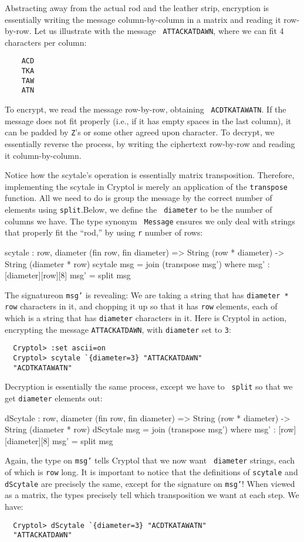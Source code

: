 Abstracting away from the actual rod and the leather strip, encryption
is essentially writing the message column-by-column in a matrix and
reading it row-by-row.  Let us illustrate with the message {\tt
  ATTACKATDAWN}, where we can fit 4 characters per column:
\begin{verbatim}
    ACD
    TKA
    TAW
    ATN
\end{verbatim}
To encrypt, we read the message row-by-row, obtaining {\tt
  ACDTKATAWATN}. If the message does not fit properly (i.e., if it has
empty spaces in the last column), it can be padded by {\tt Z}'s or
some other agreed upon character. To decrypt, we essentially reverse
the process, by writing the ciphertext row-by-row and reading it
column-by-column.

Notice how the scytale's operation is essentially matrix
transposition.  Therefore, implementing the scytale in Cryptol is
merely an application of the {\tt transpose} function.\indTranspose
All we need to do is group the message by the correct number of
elements using {\tt split}.\indSplit Below, we define the {\tt
  diameter} to be the number of columns we have. The type synonym {\tt
  Message} ensures we only deal with strings that properly fit the
``rod,'' by using {\tt r} number of rows:\indJoin

\begin{code}
  scytale : {row, diameter} (fin row, fin diameter)
            => String (row * diameter) -> String (diameter * row)
  scytale msg = join (transpose msg')
       where   msg' : [diameter][row][8]
               msg' = split msg
\end{code}
The signature\indSignature on {\tt msg'} is revealing: We are taking a
string that has {\tt diameter * row} characters in it, and chopping it
up so that it has {\tt row} elements, each of which is a string that
has {\tt diameter} characters in it.  Here is Cryptol in action,
encrypting the message {\tt ATTACKATDAWN}, with {\tt diameter} set to
{\tt 3}:
\begin{Verbatim}
  Cryptol> :set ascii=on
  Cryptol> scytale `{diameter=3} "ATTACKATDAWN"
  "ACDTKATAWATN"
\end{Verbatim}
Decryption is essentially the same process, except we have to {\tt
  split} so that we get {\tt diameter} elements
out:\indSplit\indJoin\indScytale
\begin{code}
  dScytale : {row, diameter} (fin row, fin diameter) 
             => String (row * diameter) -> String (diameter * row)
  dScytale msg = join (transpose msg')
     where   msg' : [row][diameter][8]
             msg' = split msg
\end{code}
Again, the type on {\tt msg'} tells Cryptol that we now want {\tt
  diameter} strings, each of which is {\tt row} long.  It is important
to notice that the definitions of {\tt scytale} and {\tt dScytale} are
precisely the same, except for the signature on {\tt msg'}! When
viewed as a matrix, the types precisely tell which transposition we
want at each step.  We have:
\begin{Verbatim}
  Cryptol> dScytale `{diameter=3} "ACDTKATAWATN"
  "ATTACKATDAWN"
\end{Verbatim}

